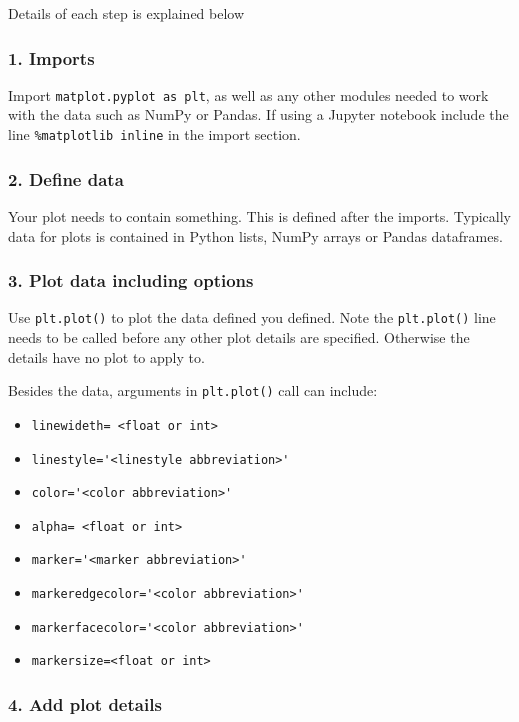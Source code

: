 \documentclass{book}
\providecommand{\tightlist}{%
      \setlength{\itemsep}{0pt}\setlength{\parskip}{0pt}}
\begin{document}
Details of each step is explained below

\subsubsection{1. Imports}\label{imports}

Import \lstinline!matplot.pyplot as plt!, as well as any other modules
needed to work with the data such as NumPy or Pandas. If using a Jupyter
notebook include the line \lstinline!%matplotlib inline! in the import
section.

\subsubsection{2. Define data}\label{define-data}

Your plot needs to contain something. This is defined after the imports.
Typically data for plots is contained in Python lists, NumPy arrays or
Pandas dataframes.

\subsubsection{3. Plot data including
options}\label{plot-data-including-options}

Use \lstinline!plt.plot()! to plot the data defined you defined. Note
the \lstinline!plt.plot()! line needs to be called before any other plot
details are specified. Otherwise the details have no plot to apply to.

Besides the data, arguments in \lstinline!plt.plot()! call can include:

\begin{itemize}
\tightlist
\item
  \lstinline!linewideth= <float or int>!
\item
  \lstinline!linestyle='<linestyle abbreviation>'!
\item
  \lstinline!color='<color abbreviation>'!
\item
  \lstinline!alpha= <float or int>!
\item
  \lstinline!marker='<marker abbreviation>'!
\item
  \lstinline!markeredgecolor='<color abbreviation>'!
\item
  \lstinline!markerfacecolor='<color abbreviation>'!
\item
  \lstinline!markersize=<float or int>!
\end{itemize}

\subsubsection{4. Add plot details}\label{add-plot-details}
\end{document}
